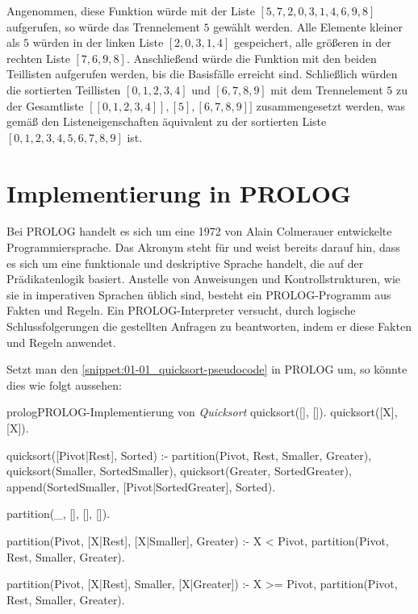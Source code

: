 Angenommen, diese Funktion würde mit der Liste $[5, 7, 2, 0, 3, 1, 4, 6, 9, 8]$ aufgerufen, so würde das Trennelement $5$ gewählt werden. Alle Elemente kleiner als $5$ würden in der linken Liste $[2, 0, 3, 1, 4]$ gespeichert, alle größeren in der rechten Liste $[7, 6, 9, 8]$. Anschließend würde die Funktion mit den beiden Teillisten aufgerufen werden, bis die Basisfälle erreicht sind. Schließlich würden die sortierten Teillisten $[0, 1, 2, 3, 4]$ und $[6, 7, 8, 9]$ mit dem Trennelement $5$ zu der Gesamtliste $[[0, 1, 2, 3, 4]], [5], [6, 7, 8, 9]]$ zusammengesetzt werden, was gemäß den Listeneigenschaften äquivalent zu der sortierten Liste $[0, 1, 2, 3, 4, 5, 6, 7, 8, 9]$ ist.

\section{Implementierung in PROLOG}
\label{sec:01-02_quicksort-prolog}

Bei PROLOG handelt es sich um eine 1972 von Alain Colmerauer entwickelte Programmiersprache. Das Akronym steht für  und weist bereits darauf hin, dass es sich um eine funktionale und deskriptive Sprache handelt, die auf der Prädikatenlogik basiert. Anstelle von Anweisungen und Kontrollstrukturen, wie sie in imperativen Sprachen üblich sind, besteht ein PROLOG-Programm aus Fakten und Regeln. Ein PROLOG-Interpreter versucht, durch logische Schlussfolgerungen die gestellten Anfragen zu beantworten, indem er diese Fakten und Regeln anwendet. \cite[S. 36 f.]{003_KII11_basics-of-artificial-intelligence}

Setzt man den \autoref{snippet:01-01_quicksort-pseudocode} in PROLOG um, so könnte dies wie folgt aussehen:

\begin{snippet}[htb]
    \centering
    \begin{codebox}{prolog}{PROLOG-Implementierung von \textit{Quicksort}}
        quicksort([], []).
        quicksort([X], [X]).

        quicksort([Pivot|Rest], Sorted) :-
            partition(Pivot, Rest, Smaller, Greater),
            quicksort(Smaller, SortedSmaller),
            quicksort(Greater, SortedGreater),
            append(SortedSmaller, [Pivot|SortedGreater], Sorted).

        partition(_, [], [], []).

        partition(Pivot, [X|Rest], [X|Smaller], Greater) :-
            X < Pivot,
            partition(Pivot, Rest, Smaller, Greater).

        partition(Pivot, [X|Rest], Smaller, [X|Greater]) :-
            X >= Pivot,
            partition(Pivot, Rest, Smaller, Greater).
    \end{codebox}
    \caption{PROLOG-Implementierung des \textit{Quicksort}-Algorithmus}
    \label{snippet:01-02_quicksort-prolog}
\end{snippet}

